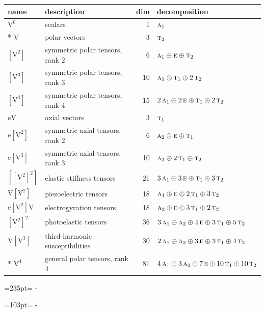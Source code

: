 \documentclass[10pt,a4paper]{article}
\newcommand{\needspace}[1]{\par\penalty-100\begingroup\dimen0=#1\relax\dimen2=\pagegoal
  \advance\dimen2-\pagetotal\ifdim\dimen0>\dimen2\relax\ifdim\dimen2>0pt\vfil\break\fi\fi
  \endgroup}
\numberwithin{equation}{section}
\newcommand{\irr}[1]{\text{\normalfont\scshape #1}}
\newcommand{\jahn}[1]{\mathrm{#1}}
\newlength{\fillwidth}\newlength{\cellwidth}\newlength{\colwidth}
\begin{document}
{\begin{longtable}{@{}llr>{\RaggedRight\arraybackslash}p{\fillwidth}@{}}
name & description & dim & decomposition\\\midrule\endhead
\bottomrule\endfoot\endlastfoot
$\jahn{V^{0}}$ & scalars & 1 & $\irr{a}_{1}$\\*
$\jahn{V}$ & polar vectors & 3 & $\irr{t}_{2}$\\
$\jahn{[V^{2}]}$ & symmetric polar tensors, rank 2 & 6 & $\irr{a}_{1} \oplus\allowbreak \irr{e} \oplus\allowbreak \irr{t}_{2}$\\
$\jahn{[V^{3}]}$ & symmetric polar tensors, rank 3 & 10 & $\irr{a}_{1} \oplus\allowbreak \irr{t}_{1} \oplus\allowbreak 2\,\irr{t}_{2}$\\
$\jahn{[V^{4}]}$ & symmetric polar tensors, rank 4 & 15 & $2\,\irr{a}_{1} \oplus\allowbreak 2\,\irr{e} \oplus\allowbreak \irr{t}_{1} \oplus\allowbreak 2\,\irr{t}_{2}$\\
$\jahn{eV}$ & axial vectors & 3 & $\irr{t}_{1}$\\
$\jahn{e[V^{2}]}$ & symmetric axial tensors, rank 2 & 6 & $\irr{a}_{2} \oplus\allowbreak \irr{e} \oplus\allowbreak \irr{t}_{1}$\\
$\jahn{e[V^{3}]}$ & symmetric axial tensors, rank 3 & 10 & $\irr{a}_{2} \oplus\allowbreak 2\,\irr{t}_{1} \oplus\allowbreak \irr{t}_{2}$\\
$\jahn{[[V^{2}]^{2}]}$ & elastic stiffness tensors & 21 & $3\,\irr{a}_{1} \oplus\allowbreak 3\,\irr{e} \oplus\allowbreak \irr{t}_{1} \oplus\allowbreak 3\,\irr{t}_{2}$\\
$\jahn{V[V^{2}]}$ & piezoelectric tensors & 18 & $\irr{a}_{1} \oplus\allowbreak \irr{e} \oplus\allowbreak 2\,\irr{t}_{1} \oplus\allowbreak 3\,\irr{t}_{2}$\\
$\jahn{e[V^{2}]V}$ & electrogyration tensors & 18 & $\irr{a}_{2} \oplus\allowbreak \irr{e} \oplus\allowbreak 3\,\irr{t}_{1} \oplus\allowbreak 2\,\irr{t}_{2}$\\
$\jahn{[V^{2}]^{2}}$ & photoelastic tensors & 36 & $3\,\irr{a}_{1} \oplus\allowbreak \irr{a}_{2} \oplus\allowbreak 4\,\irr{e} \oplus\allowbreak 3\,\irr{t}_{1} \oplus\allowbreak 5\,\irr{t}_{2}$\\
$\jahn{V[V^{3}]}$ & third-harmonic susceptibilities & 30 & $2\,\irr{a}_{1} \oplus\allowbreak \irr{a}_{2} \oplus\allowbreak 3\,\irr{e} \oplus\allowbreak 3\,\irr{t}_{1} \oplus\allowbreak 4\,\irr{t}_{2}$\\*
$\jahn{V^{4}}$ & general polar tensors, rank 4 & 81 & $4\,\irr{a}_{1} \oplus\allowbreak 3\,\irr{a}_{2} \oplus\allowbreak 7\,\irr{e} \oplus\allowbreak 10\,\irr{t}_{1} \oplus\allowbreak 10\,\irr{t}_{2}$\\
\bottomrule\end{longtable}}
\needspace{235pt}
\needspace{103pt}
\end{document}
